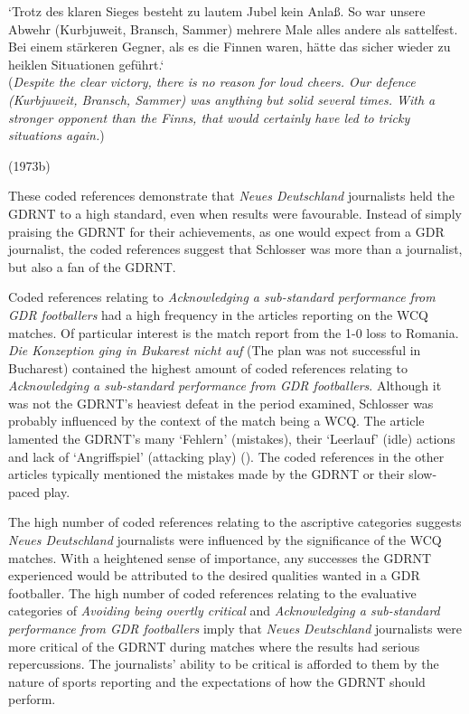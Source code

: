 \begin{displayquote}
\begin{small}
‘Trotz des klaren Sieges besteht zu lautem Jubel kein Anlaß. So war unsere Abwehr (Kurbjuweit, Bransch, Sammer) mehrere Male alles andere als sattelfest. Bei einem stärkeren Gegner, als es die Finnen waren, hätte das sicher wieder zu heiklen Situationen geführt.‘\\
(\textit{Despite the clear victory, there is no reason for loud cheers. Our defence (Kurbjuweit, Bransch, Sammer) was anything but solid several times. With a stronger opponent than the Finns, that would certainly have led to tricky situations again.})\
\begin{flushright}\footnotesize (1973b)\end{flushright}
\end{small}
\end{displayquote}

These coded references demonstrate that \textit{Neues Deutschland} journalists held the GDRNT to a high standard, even when results were favourable. Instead of simply praising the GDRNT for their achievements, as one would expect from a GDR journalist, the coded references suggest that Schlosser was more than a journalist, but also a fan of the GDRNT.

Coded references relating to \textit{Acknowledging a sub-standard performance from GDR footballers} had a high frequency in the articles reporting on the WCQ matches. Of particular interest is the match report from the 1-0 loss to Romania. \textit{Die Konzeption ging in Bukarest nicht auf} (The plan was not successful in Bucharest) contained the highest amount of coded references relating to \textit{Acknowledging a sub-standard performance from GDR footballers}. Although it was not the GDRNT’s heaviest defeat in the period examined, Schlosser was probably influenced by the context of the match being a WCQ. The article lamented the GDRNT’s many ‘Fehlern’ (mistakes), their ‘Leerlauf’ (idle) actions and lack of ‘Angriffspiel’ (attacking play) (\cite{nd19730528}). The coded references in the other articles typically mentioned the mistakes made by the GDRNT or their slow-paced play.

The high number of coded references relating to the ascriptive categories suggests \textit{Neues Deutschland} journalists were influenced by the significance of the WCQ matches. With a heightened sense of importance, any successes the GDRNT experienced would be attributed to the desired qualities wanted in a GDR footballer. The high number of coded references relating to the evaluative categories of \textit{Avoiding being overtly critical} and \textit{Acknowledging a sub-standard performance from GDR footballers} imply that \textit{Neues Deutschland} journalists were more critical of the GDRNT during matches where the results had serious repercussions. The journalists’ ability to be critical is afforded to them by the nature of sports reporting and the expectations of how the GDRNT should perform.

